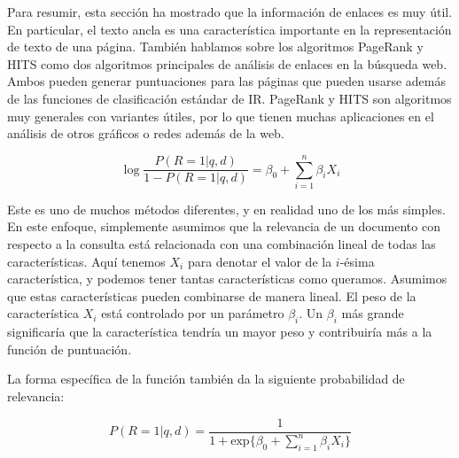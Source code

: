 Para resumir, esta sección ha mostrado que la información de enlaces es muy útil. En particular, el texto ancla es una característica importante en la representación de texto de una página. También hablamos sobre los algoritmos PageRank y HITS como dos algoritmos principales de análisis de enlaces en la búsqueda web. Ambos pueden generar puntuaciones para las páginas que pueden usarse además de las funciones de clasificación estándar de IR. PageRank y HITS son algoritmos muy generales con variantes útiles, por lo que tienen muchas aplicaciones en el análisis de otros gráficos o redes además de la web.

\begin{equation}
\log \frac{P (R = 1 | q, d)}{1 - P (R = 1 | q, d)} = \beta_0 + \sum_{i = 1}^n \beta_i X_i
\end{equation}

Este es uno de muchos métodos diferentes, y en realidad uno de los más simples. En este enfoque, simplemente asumimos que la relevancia de un documento con respecto a la consulta está relacionada con una combinación lineal de todas las características. Aquí tenemos \(X_i\) para denotar el valor de la \(i\)-ésima característica, y podemos tener tantas características como queramos. Asumimos que estas características pueden combinarse de manera lineal. El peso de la característica \(X_i\) está controlado por un parámetro \(\beta_i\). Un \(\beta_i\) más grande significaría que la característica tendría un mayor peso y contribuiría más a la función de puntuación.

La forma específica de la función también da la siguiente probabilidad de relevancia:

\begin{equation}
P (R = 1 | q, d) = \frac{1}{1 + \text{exp}\{\beta_0 + \sum_{i = 1}^n \beta_i X_i\}}
\end{equation}